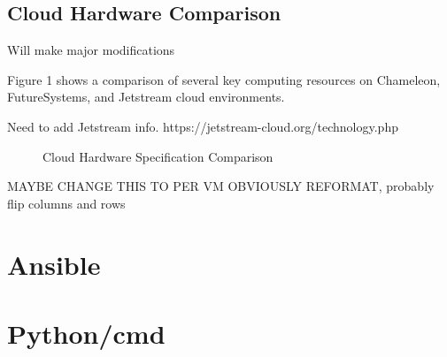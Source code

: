 \documentclass[9pt,twocolumn,twoside]{styles/osajnl}
\begin{document}
\subsection{Cloud Hardware Comparison}


Will make major modifications

Figure 1 shows a comparison of several key computing resources on Chameleon, FutureSystems, and Jetstream cloud environments.

Need to add Jetstream info.
https://jetstream-cloud.org/technology.php

\begin{figure}[ht]
  \caption{Cloud Hardware Specification Comparison} \cite{www-chamHardware} \cite{www-kiloHardware} 
\end{figure}

MAYBE CHANGE THIS TO PER VM
OBVIOUSLY REFORMAT, probably flip columns and rows

\section{Ansible}

\section{Python/cmd}
\end{document}
